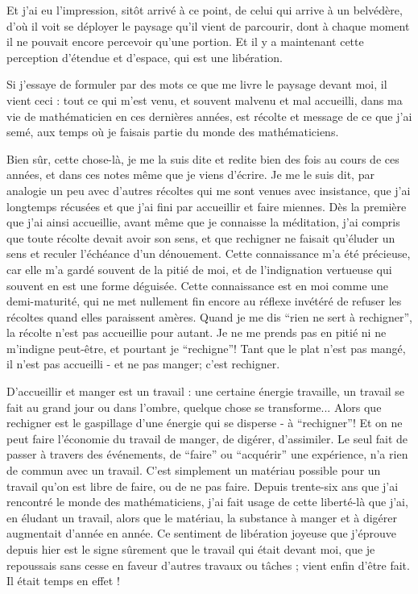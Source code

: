 Et j'ai eu l'impression, sitôt arrivé à ce point, de celui qui arrive à un belvédère, d'où il voit se déployer le paysage qu'il vient de parcourir, dont à chaque moment il ne pouvait encore percevoir qu'une portion. Et il y a maintenant cette perception d'étendue et d'espace, qui est une libération.

Si j'essaye de formuler par des mots ce que me livre le paysage devant moi, il vient ceci : tout ce qui m'est venu, et souvent malvenu et mal accueilli, dans ma vie de mathématicien en ces dernières années, est récolte et message de ce que j'ai semé, aux temps où je faisais partie du monde des mathématiciens.

Bien sûr, cette chose-là, je me la suis dite et redite bien des fois au cours de ces années, et dans ces notes même que je viens d'écrire. Je me le suis dit, par analogie un peu avec d'autres récoltes qui me sont venues avec insistance, que j'ai longtemps récusées et que j'ai fini par accueillir et faire miennes. Dès la première que j'ai ainsi accueillie, avant même que je connaisse la méditation, j'ai compris que toute récolte devait avoir son sens, et que rechigner ne faisait qu'éluder un sens et reculer l'échéance d'un dénouement. Cette connaissance m'a été précieuse, car elle m'a gardé souvent de la pitié de moi, et de l'indignation vertueuse qui souvent en est une forme déguisée. Cette connaissance est en moi comme une demi-maturité, qui ne met nullement fin encore au réflexe invétéré de refuser les récoltes quand elles paraissent amères. Quand je me dis ``rien ne sert à rechigner'', la récolte n'est pas accueillie pour autant. Je ne me prends pas en pitié ni ne m'indigne peut-être, et pourtant je ``rechigne''! Tant que le plat n'est pas mangé, il n'est pas accueilli - et ne pas manger; c'est rechigner.

D'accueillir et manger est un travail : une certaine énergie travaille, un travail se fait au grand jour ou dans l'ombre, quelque chose se transforme... Alors que rechigner est le gaspillage d'une énergie qui se disperse - à ``rechigner''! Et on ne peut faire l'économie du travail de manger, de digérer, d'assimiler. Le seul fait de passer à travers des événements, de ``faire'' ou ``acquérir'' une expérience, n'a rien de commun avec un travail. C'est simplement un matériau possible pour un travail qu'on est libre de faire, ou de ne pas faire. Depuis trente-six ans que j'ai rencontré le monde des mathématiciens, j'ai fait usage de cette liberté-là que j'ai, en éludant un travail, alors que le matériau, la substance à manger et à digérer augmentait d'année en année. Ce sentiment de libération joyeuse que j'éprouve depuis hier est le signe sûrement que le travail qui était devant moi, que je repoussais sans cesse en faveur d'autres travaux ou tâches ; vient enfin d'être fait. Il était temps en effet !

